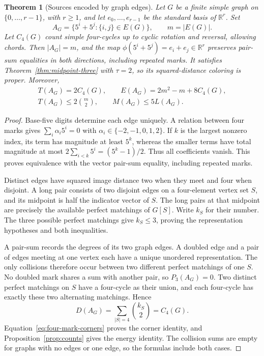 \documentclass[11pt,a4paper]{article}
\newtheorem{theorem}{Theorem}[section]
\theoremstyle{definition}
\newcommand{\R}{\mathbb R}
\numberwithin{equation}{section}
\begin{document}
\begin{theorem}[Sources encoded by graph edges]\label{thm:graph-source}
Let $G$ be a finite simple graph on $\{0,\ldots,r-1\}$, with $r\ge1$, and let $e_0,\ldots,e_{r-1}$ be the standard basis of $\R^r$. Set
\begin{equation}\label{eq:graph-source}
A_G=\{5^i+5^j:\{i,j\}\in E(G)\},\qquad m=|E(G)|.
\end{equation}
Let $C_4(G)$ count simple four-cycles up to cyclic rotation and reversal, allowing chords. Then $|A_G|=m$, and the map $\phi(5^i+5^j)=e_i+e_j\in\R^r$ preserves pair-sum equalities in both directions, including repeated marks. It satisfies Theorem~\ref{thm:midpoint-three} with $\tau=2$, so its squared-distance coloring is proper. Moreover,
\begin{equation}\label{eq:graph-counts}
\begin{gathered}
T(A_G)=2C_4(G),\qquad E(A_G)=2m^2-m+8C_4(G),\\
T(A_G)\le2\binom m2,\qquad M(A_G)\le5L(A_G).
\end{gathered}
\end{equation}
\end{theorem}
\begin{proof}
Base-five digits determine each edge uniquely. A relation between four marks gives $\sum_i\alpha_i5^i=0$ with $\alpha_i\in\{-2,-1,0,1,2\}$. If $k$ is the largest nonzero index, its term has magnitude at least $5^k$, whereas the smaller terms have total magnitude at most $2\sum_{i<k}5^i=(5^k-1)/2$. Thus all coefficients vanish. This proves equivalence with the vector pair-sum equality, including repeated marks.

Distinct edges have squared image distance two when they meet and four when disjoint. A long pair consists of two disjoint edges on a four-element vertex set $S$, and its midpoint is half the indicator vector of $S$. The long pairs at that midpoint are precisely the available perfect matchings of $G[S]$. Write $k_S$ for their number. The three possible perfect matchings give $k_S\le3$, proving the representation hypotheses and both inequalities.

A pair-sum records the degrees of its two graph edges. A doubled edge and a pair of edges meeting at one vertex each have a unique unordered representation. The only collisions therefore occur between two different perfect matchings of one $S$. No doubled mark shares a sum with another pair, so $P_3(A_G)=0$. Two distinct perfect matchings on $S$ have a four-cycle as their union, and each four-cycle has exactly these two alternating matchings. Hence
\[
D(A_G)=\sum_{|S|=4}\binom{k_S}{2}=C_4(G).
\]
Equation~\eqref{eq:four-mark-corners} proves the corner identity, and Proposition~\ref{prop:counts} gives the energy identity. The collision sums are empty for graphs with no edges or one edge, so the formulas include both cases.
\end{proof}
\end{document}
